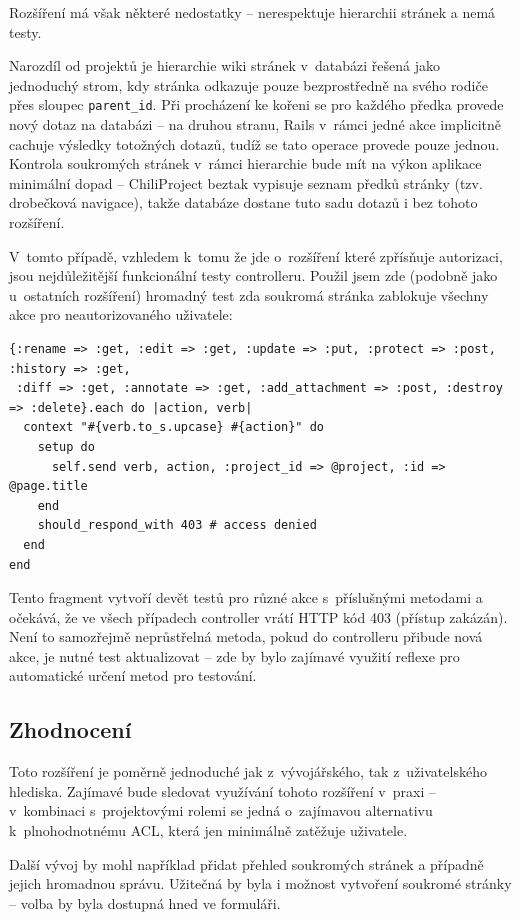 \documentclass[thesis=B,czech]{FITthesis}[2012/05/02]
\begin{document}
Rozšíření má však některé nedostatky -- nerespektuje hierarchii stránek
a nemá testy.

Narozdíl od projektů je hierarchie wiki stránek v~databázi řešená jako
jednoduchý strom, kdy stránka odkazuje pouze bezprostředně na svého
rodiče přes sloupec \lstinline!parent_id!. Při procházení ke kořeni se
pro každého předka provede nový dotaz na databázi -- na druhou stranu,
Rails v~rámci jedné akce implicitně cachuje výsledky totožných dotazů,
tudíž se tato operace provede pouze jednou. Kontrola soukromých stránek
v~rámci hierarchie bude mít na výkon aplikace minimální dopad --
ChiliProject beztak vypisuje seznam předků stránky (tzv. drobečková
navigace), takže databáze dostane tuto sadu dotazů i bez tohoto
rozšíření.

V~tomto případě, vzhledem k~tomu že jde o~rozšíření které zpřísňuje
autorizaci, jsou nejdůležitější funkcionální testy controlleru. Použil
jsem zde (podobně jako u~ostatních rozšíření) hromadný test zda soukromá
stránka zablokuje všechny akce pro neautorizovaného uživatele:

\begin{lstlisting}
{:rename => :get, :edit => :get, :update => :put, :protect => :post, :history => :get,
 :diff => :get, :annotate => :get, :add_attachment => :post, :destroy => :delete}.each do |action, verb|
  context "#{verb.to_s.upcase} #{action}" do
    setup do
      self.send verb, action, :project_id => @project, :id => @page.title
    end
    should_respond_with 403 # access denied
  end
end
\end{lstlisting}
Tento fragment vytvoří devět testů pro různé akce s~příslušnými metodami
a očekává, že ve všech případech controller vrátí HTTP kód 403
(přístup zakázán). Není to samozřejmě neprůstřelná metoda, pokud do
controlleru přibude nová akce, je nutné test aktualizovat -- zde by bylo
zajímavé využití reflexe pro automatické určení metod pro testování.

\subsection{Zhodnocení}

Toto rozšíření je poměrně jednoduché jak z~vývojářského, tak
z~uživatelského hlediska. Zajímavé bude sledovat využívání tohoto
rozšíření v~praxi -- v~kombinaci s~projektovými rolemi se jedná
o~zajímavou alternativu k~plnohodnotnému \gls{ACL}, která jen minimálně
zatěžuje uživatele.

Další vývoj by mohl například přidat přehled soukromých stránek a
případně jejich hromadnou správu. Užitečná by byla i možnost vytvoření
soukromé stránky -- volba by byla dostupná hned ve formuláři.
\end{document}
